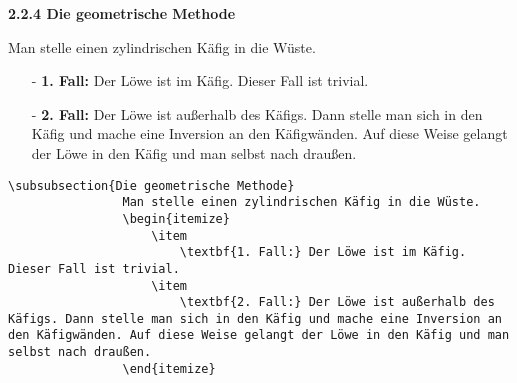 \documentclass["WS\space 16-17\space -\space LaTeX-Kurs\space -\space Praesentation\space -\space 2.tex"]{subfiles}
\begin{document}
\begin{frame}[fragile]
	\Losung
		\begin{outputbox}
			{\large\textbf{2.2.4 Die geometrische Methode}}
			
			Man stelle einen zylindrischen Käfig in die Wüste.\vspace{-0.1cm}
			\begin{itemize}
				\item[-]
					\textbf{1. Fall:} Der Löwe ist im Käfig. Dieser Fall ist trivial.
				\item[-]
					\textbf{2. Fall:} Der Löwe ist außerhalb des Käfigs. Dann stelle man sich in den Käfig und mache eine Inversion an den Käfigwänden. Auf diese Weise gelangt der Löwe in den Käfig und man selbst nach draußen.
			\end{itemize}
			\vspace{-0.2cm}
		\end{outputbox}
	\Code
		\begin{lstlisting}[gobble=12]
			\subsubsection{Die geometrische Methode}
				Man stelle einen zylindrischen Käfig in die Wüste.
				\begin{itemize}
					\item
						\textbf{1. Fall:} Der Löwe ist im Käfig. Dieser Fall ist trivial.
					\item
						\textbf{2. Fall:} Der Löwe ist außerhalb des Käfigs. Dann stelle man sich in den Käfig und mache eine Inversion an den Käfigwänden. Auf diese Weise gelangt der Löwe in den Käfig und man selbst nach draußen.
				\end{itemize}
		\end{lstlisting}
\end{frame}
\end{document}
